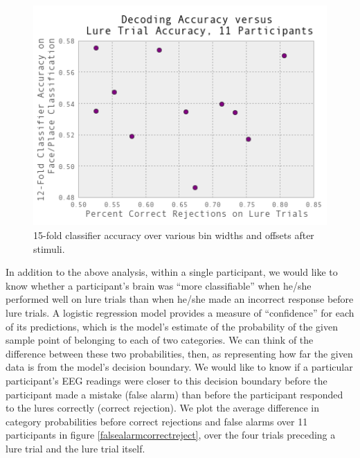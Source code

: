\documentclass[11pt]{report}
\begin{document}
\begin{figure}[t]
\centerline{
	\includegraphics[width=4.5in]{response_acc_vs_class_acc}
}
\caption{15-fold classifier accuracy over various bin widths and offsets after stimuli.\label{responsevsclass}}
\end{figure}

In addition to the above analysis, within a single participant, we would like to know whether a participant's brain was ``more classifiable'' when he/she performed well on lure trials than when he/she made an incorrect response before lure trials.  A logistic regression model provides a measure of ``confidence'' for each of its predictions, which is the model's estimate of the probability of the given sample point of belonging to each of two categories.  We can think of the difference between these two probabilities, then, as representing how far the given data is from the model's decision boundary.  We would like to know if a particular participant's EEG readings were closer to this decision boundary before the participant made a mistake (false alarm) than before the participant responded to the lures correctly (correct rejection).  We plot the average difference in category probabilities before correct rejections and false alarms over 11 participants in figure \ref{falsealarmcorrectreject}, over the four trials preceding a lure trial and the lure trial itself.  
\end{document}
